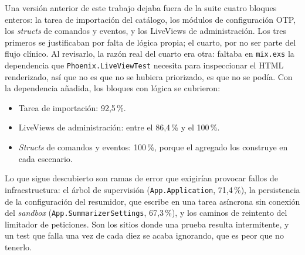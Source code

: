 Una versión anterior de este trabajo dejaba fuera de la suite cuatro bloques enteros: la tarea de importación del catálogo, los módulos de configuración OTP, los \emph{structs} de comandos y eventos, y los LiveViews de administración. Los tres primeros se justificaban por falta de lógica propia; el cuarto, por no ser parte del flujo clínico. Al revisarlo, la razón real del cuarto era otra: faltaba en \texttt{mix.exs} la dependencia que \texttt{Phoenix.LiveViewTest} necesita para inspeccionar el HTML renderizado, así que no es que no se hubiera priorizado, es que no se podía. Con la dependencia añadida, los bloques con lógica se cubrieron:

\begin{itemize}
 \item Tarea de importación: 92,5\,\%.
 \item LiveViews de administración: entre el 86,4\,\% y el 100\,\%.
 \item \emph{Structs} de comandos y eventos: 100\,\%, porque el agregado los construye en cada escenario.
\end{itemize}

Lo que sigue descubierto son ramas de error que exigirían provocar fallos de infraestructura: el árbol de supervisión (\texttt{App.Application}, 71,4\,\%), la persistencia de la configuración del resumidor, que escribe en una tarea asíncrona sin conexión del \emph{sandbox} (\texttt{App.SummarizerSettings}, 67,3\,\%), y los caminos de reintento del limitador de peticiones. Son los sitios donde una prueba resulta intermitente, y un test que falla una vez de cada diez se acaba ignorando, que es peor que no tenerlo.
